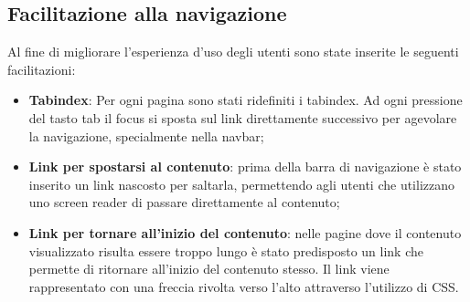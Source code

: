 \subsection{Facilitazione alla navigazione}
Al fine di migliorare l'esperienza d'uso degli utenti sono state inserite le seguenti facilitazioni:
\begin{itemize}
	\item \textbf{Tabindex}: Per ogni pagina sono stati ridefiniti i tabindex. Ad ogni pressione
	del tasto tab il focus si sposta sul link direttamente successivo per agevolare la
	navigazione, specialmente nella navbar;
	\item \textbf{Link per spostarsi al contenuto}: prima della barra di navigazione è stato inserito un link nascosto per saltarla, permettendo agli utenti che utilizzano uno screen reader di passare direttamente al contenuto;
	\item \textbf{Link per tornare all'inizio del contenuto}: nelle pagine dove il contenuto visualizzato risulta essere troppo lungo è stato predisposto un link che permette di ritornare all'inizio del contenuto stesso. Il link viene rappresentato con una freccia rivolta verso l'alto attraverso l'utilizzo di CSS.
\end{itemize}
\newpage